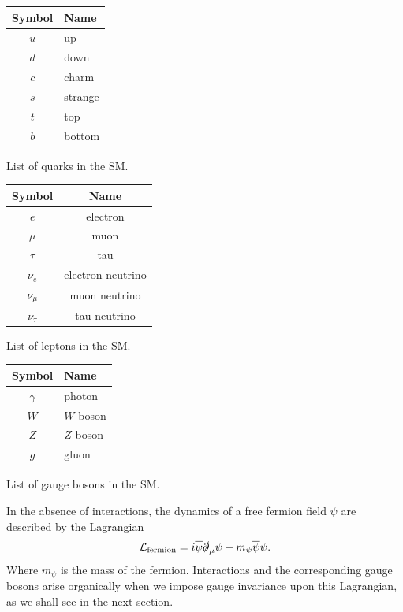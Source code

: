 \begin{margintable}[-15cm]
  \centering
  \begin{tabular}{c|l}
    Symbol & Name \\
  \hline
    $u$ & up\\
    $d$ & down \\
    $c$ & charm \\
    $s$ & strange \\
    $t$ & top \\
    $b$ & bottom \\
  \end{tabular}
  \caption{List of quarks in the SM.}
  \label{tab:quarks}
\end{margintable}

\begin{margintable}[-8cm]
  \centering
\begin{tabular}{c|c}
    Symbol & Name \\
  \hline
    $e$ & electron\\
    $\mu$ & muon \\
    $\tau$ & tau \\
    $\nu_e$ & electron neutrino \\
    $\nu_\mu$ & muon neutrino \\
    $\nu_\tau$ & tau neutrino \\
  \end{tabular}
  \caption{List of leptons in the SM.}
  \label{tab:leptons}
\end{margintable}

\begin{margintable}[-1cm]
  \centering
\begin{tabular}{c|l}
    Symbol & Name \\
  \hline
    $\gamma$ & photon\\
    $W$ & $W$ boson \\
    $Z$ & $Z$ boson \\
    $g$ & gluon \\
  \end{tabular}
  \caption{List of gauge bosons in the SM.}
  \label{tab:gaugebosons}
\end{margintable}

In the absence of interactions, the dynamics of a free fermion field $\psi$ are described by the Lagrangian
\begin{align}
  \mathcal{L}_\text{fermion} = i\overline{\psi}\slashed{\partial}_\mu\psi-m_{\psi}\overline{\psi}\psi.
\label{eq:fermion_lagrangian}
\end{align}
Where $m_\psi$ is the mass of the fermion. Interactions and the corresponding gauge bosons arise organically when we impose gauge invariance upon this Lagrangian, as we shall see in the next section.

